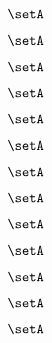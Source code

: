 \begin{forslides}
     \begin{equation}
        \label{eq:combination-167}
        \setA
    \end{equation}
    
     \begin{equation}
        \label{eq:combination-168}
        \setA
    \end{equation}
    
    \begin{equation}
        \label{eq:combination-169}
       \setA
    \end{equation}
    
       \begin{equation}
        \label{eq:combination-170}
        \setA
    \end{equation}
       
     \begin{equation}
        \label{eq:combination-171}
        \setA
    \end{equation}
    
     \begin{equation}
        \label{eq:combination-172}
        \setA
    \end{equation}
    
    \begin{equation}
        \label{eq:combination-173}
        \setA
    \end{equation}
    
     \begin{equation}
        \label{eq:combination-174}
        \setA
    \end{equation}
    
     \begin{equation}
        \label{eq:combination-175}
        \setA
    \end{equation}
    
    \begin{equation}
        \label{eq:combination-176}
        \setA
    \end{equation}
    
     \begin{equation}
        \label{eq:combination-177}
        \setA
    \end{equation}
    
     \begin{equation}
        \label{eq:combination-178}
        \setA
    \end{equation}
    
    \begin{equation}
        \label{eq:combination-179}
       \setA
    \end{equation}
    

\end{forslides}
